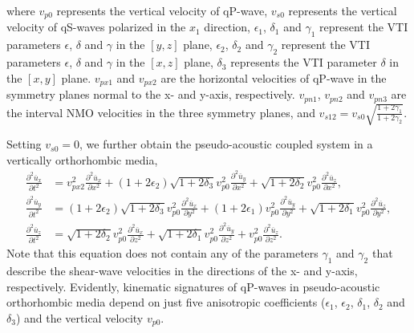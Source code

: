 where $v_{p0}$ represents the vertical velocity of qP-wave, $v_{s0}$ represents the vertical velocity of qS-waves polarized
in the $x_{1}$ direction, $\epsilon_{1}$, $\delta_{1}$ and $\gamma_{1}$ represent the VTI parameters $\epsilon$, $\delta$
 and $\gamma$ in the $[y,z]$ plane, $\epsilon_{2}$, $\delta_{2}$ and $\gamma_{2}$ represent the VTI parameters
 $\epsilon$, $\delta$ and $\gamma$ in the $[x,z]$ plane, $\delta_{3}$ represents the VTI parameter $\delta$ 
in the $[x,y]$ plane. $v_{px1}$ and $v_{px2}$  are the
 horizontal velocities of qP-wave in the
symmetry planes normal to the x- and y-axis, respectively.
$v_{pn1}$, $v_{pn2}$ and $v_{pn3}$ 
are the interval NMO velocities
 in the three symmetry planes, and $v_{s12}=v_{s0}\sqrt{\frac{1+2\gamma_{1}}{1+2\gamma_{2}}}$.

Setting $v_{s0}=0$, we further obtain the pseudo-acoustic coupled system in a vertically orthorhombic media,
\begin{equation}
\label{eq:ortA}
\begin{split}
\frac{\partial^2\overline{u}_x}{\partial t^2} &= v_{px2}^2\frac{\partial^2{\overline{u}_x}}{\partial x^2}
                                              + (1+2\epsilon_{2})\sqrt{1+2\delta_{3}}{v_{p0}^2}
                                                \frac{\partial^2{\overline{u}_y}}{\partial x^2} 
                                              + \sqrt{1+2\delta_{2}}{v_{p0}^2}
                                                \frac{\partial^2{\overline{u}_z}}{\partial x^2}, \\
\frac{\partial^2\overline{u}_y}{\partial t^2} &= (1+2\epsilon_{2})\sqrt{1+2\delta_{3}}{v_{p0}^2}
                                               \frac{\partial^2{\overline{u}_x}}{\partial y^2}
                                             +(1+2\epsilon_{1}){v_{p0}^2}\frac{\partial^2{\overline{u}_y}}{\partial y^2} 
                                             + \sqrt{1+2\delta_{1}}{v_{p0}^2}
                                               \frac{\partial^2{\overline{u}_z}}{\partial y^2}, \\
\frac{\partial^2\overline{u}_z}{\partial t^2} & = \sqrt{1+2\delta_{2}}{v_{p0}^2}
                                               \frac{\partial^2{\overline{u}_x}}{\partial z^2} 
                                             + \sqrt{1+2\delta_{1}}{v_{p0}^2}
                                               \frac{\partial^2{\overline{u}_y}}{\partial z^2}
                                             + {v_{p0}^2}\frac{\partial^2{\overline{u}_z}}{\partial z^2}.
\end{split}
\end{equation}
Note that this equation does not contain any of the parameters $\gamma_{1}$ and $\gamma_{2}$ that describe
 the shear-wave velocities in the directions of the x- and y-axis, respectively.
 Evidently, kinematic signatures of qP-waves in pseudo-acoustic
 orthorhombic media depend on just five anisotropic coefficients ($\epsilon_{1}$, $\epsilon_{2}$, $\delta_{1}$,
 $\delta_{2}$ and $\delta_{3}$) and the vertical velocity $v_{p0}$.

